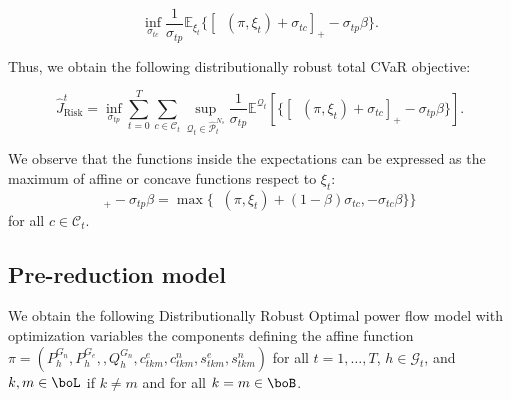 \documentclass[11pt,a4paper,oneside,openany]{book}
\DeclareMathOperator{\C}{C_{tc}}
\numberwithin{definition}{section}
\numberwithin{theorem}{section}
\numberwithin{problem}{section}
\begin{document}
\begin{equation}
    \inf_{\sigma_{tc}}\frac{1}{\sigma_{tp}}\mathbb{E}_{\xi_t}\{[\C(\pi,\xi_t)+ \sigma_{tc}]_+ - \sigma_{tp}\beta\}.
\end{equation}

Thus, we obtain the following distributionally robust total CVaR objective:

\begin{equation}
    \hat{J}^t_{\text{Risk}} = \inf_{\sigma_{tp}}\sum_{t=0}^T \sum_{c \in \mathcal{C}_t} \sup_{\mathcal{Q}_t \in \hat{\mathcal{P}}_t^{N_s}}\frac{1}{\sigma_{tp}} \mathbb{E}^{\mathcal{Q}_t}[
    \{[\C(\pi,\xi_t)+ \sigma_{tc}]_+ - \sigma_{tp}\beta\}].
\end{equation}


We observe that the functions inside the expectations can be expressed as the maximum of affine or concave functions respect to $\xi_t$:
\begin{equation*}
    [\C(\pi,\xi_t)+ \sigma_{tc}]_+ - \sigma_{tp}\beta = \max\{\C(\pi,\xi_t)+(1-\beta)\sigma_{tc}, -\sigma_{tc}\beta\}\}
\end{equation*} 
for all $c \in \mathcal{C}_t$.

\subsection{Pre-reduction model}
We obtain the following Distributionally Robust Optimal power flow model with optimization variables the components defining the affine function $ \pi = (P^{G_n}_h, P^{G_e}_h, ,Q^{G_n}_h, c^e_{tkm}, c^n_{tkm} ,s^e_{tkm}, s^n_{tkm})$ for all $t = 1, \ldots, T$,
$h \in \mathcal{G}_t$, and ${k,m} \in \boL$ if $k \neq m$ and for all $k = m \in \boB$. 
\end{document}
